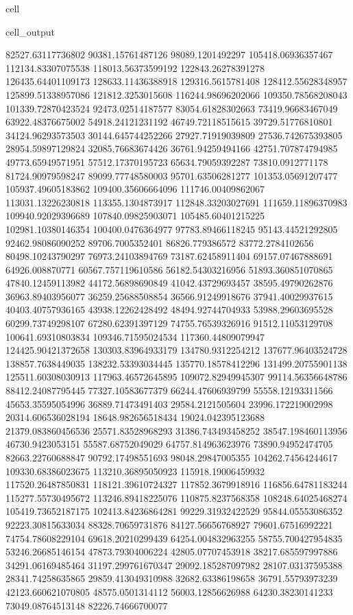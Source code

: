 \documentclass[letterpaper,10pt,english]{jupyterBook}
\begin{document}
\begin{sphinxuseclass}{cell}
\begin{sphinxVerbatimOutput}
\begin{sphinxuseclass}{cell_output}
\begin{sphinxVerbatim}[commandchars=\\\{\}]
82527.63117736802  90381.15761487126  98089.1201492297  105418.06936357467  112134.83307075538  118013.56373599192  122843.26278391278  126435.64401109173  128633.11436388918  129316.5615781408  128412.55628348957  125899.51338957086  121812.3253015608  116244.98696202066  109350.78568208043  101339.72870423524  92473.02514187577  83054.61828302663  73419.96683467049  63922.48376675002  54918.24121231192  46749.72118515615  39729.51776810801  34124.96293573503  30144.645744252266  27927.71919039809  27536.742675393805  28954.59897129824  32085.76683674426  36761.94259494166  42751.707874794985  49773.65949571951  57512.17370195723  65634.79059392287  73810.0912771178  81724.90979598247  89099.77748580003  95701.63506281277  101353.05691207477  105937.49605183862  109400.35606664096  111746.00409862067  113031.13226230818  113355.1304873917  112848.33203027691  111659.11896370983  109940.92029396689  107840.09825903071  105485.60401215225  102981.10380146354  100400.0476364977  97783.89466118245  95143.44521292805  92462.98086090252  89706.7005352401  86826.779386572  83772.2784102656  80498.10243790297  76973.24103894769  73187.62458911404  69157.07467888691  64926.008870771  60567.757119610586  56182.54303216956  51893.360851070865  47840.12459113982  44172.56898690849  41042.43729693457  38595.49790262876  36963.89403956077  36259.25688508854  36566.91249918676  37941.40029937615  40403.40757936165  43938.12262428492  48494.92744704933  53988.29603695528  60299.73749298107  67280.62391397129  74755.76539326916  
91512.11053129708  100641.69310803834  109346.71595024534  117360.44809079947  124425.90421372658  130303.83964933179  134780.9312254212  137677.96403524728  138857.7638449035  138232.53393034445  135770.18578412296  131499.20755901138  125511.60308030913  117963.46572645895  109072.82949945307  99114.56356648786  88412.24087795445  77327.10583677379  66244.47606939799  55558.12193311566  45653.35595054996  36889.71473491403  29584.2121505604  23996.172219002998  20314.606536028194  18648.982656518434  19024.042395123688  21379.083860456536  25571.83528968293  31386.743493458252  38547.198460113956  46730.9423053151  55587.68752049029  64757.814963623976  73890.94952474705  82663.22760688847  90792.17498551693  98048.29847005355  104262.74564244617  109330.68386023675  113210.36895050923  115918.19006459932  117520.26487850831  118121.39610724327  117852.3679918916  116856.64781183244  115277.55730495672  113246.89418225076  110875.8237568358  108248.64025468274  105419.73652187175  102413.84236864281  99229.31932422529  95844.05553086352  92223.30815633034  88328.70659731876  84127.56656768927  79601.67516992221  74754.78608229104  69618.20210299439  64254.004832963255  58755.700427954835  53246.26685146154  47873.79304006224  42805.07707453918  38217.685597997886  34291.06169485464  31197.299761670347  29092.185287097982  28107.03137595388  28341.74258635865  29859.413049310988  32682.63386198658  36791.55793973239  42123.660621070805  48575.0501314112  56003.12856626988  64230.38230141233  73049.08764513148  82226.74666700077  

\end{sphinxVerbatim}
\end{sphinxuseclass}
\end{sphinxVerbatimOutput}
\end{sphinxuseclass}
\end{document}
